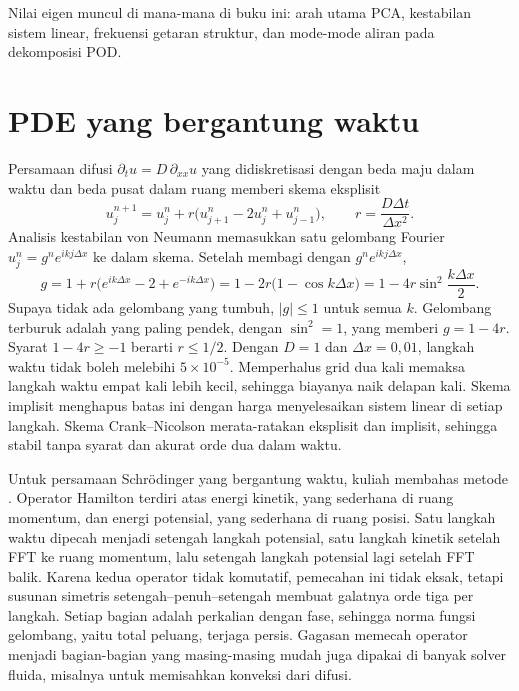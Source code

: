Nilai eigen muncul di mana-mana di buku ini: arah utama PCA, kestabilan sistem linear, frekuensi getaran struktur,
dan mode-mode aliran pada dekomposisi POD.

\section{PDE yang bergantung waktu}

Persamaan difusi $\partial_tu=D\,\partial_{xx}u$ yang didiskretisasi dengan beda maju dalam waktu dan beda pusat
dalam ruang memberi skema eksplisit
\begin{equation}
u_j^{n+1}=u_j^n+r\big(u_{j+1}^n-2u_j^n+u_{j-1}^n\big),\qquad r=\frac{D\Delta t}{\Delta x^2}.
\end{equation}
Analisis kestabilan von Neumann memasukkan satu gelombang Fourier $u_j^n=g^ne^{ikj\Delta x}$ ke dalam skema. Setelah
membagi dengan $g^ne^{ikj\Delta x}$,
\begin{equation}
g=1+r\big(e^{ik\Delta x}-2+e^{-ik\Delta x}\big)=1-2r\big(1-\cos k\Delta x\big)=1-4r\sin^2\frac{k\Delta x}2 .
\end{equation}
Supaya tidak ada gelombang yang tumbuh, $|g|\le1$ untuk semua $k$. Gelombang terburuk adalah yang paling pendek, dengan
$\sin^2=1$, yang memberi $g=1-4r$. Syarat $1-4r\ge-1$ berarti $r\le1/2$. Dengan $D=1$ dan $\Delta x=0{,}01$, langkah waktu
tidak boleh melebihi $5\times10^{-5}$. Memperhalus grid dua kali memaksa langkah waktu empat kali lebih kecil, sehingga
biayanya naik delapan kali. Skema implisit menghapus batas ini dengan harga menyelesaikan sistem linear di setiap
langkah. Skema Crank--Nicolson merata-ratakan eksplisit dan implisit, sehingga stabil tanpa syarat dan akurat orde dua dalam
waktu.

Untuk persamaan Schrödinger yang bergantung waktu, kuliah membahas metode . Operator Hamilton terdiri
atas energi kinetik, yang sederhana di ruang momentum, dan energi potensial, yang sederhana di ruang posisi. Satu langkah
waktu dipecah menjadi setengah langkah potensial, satu langkah kinetik setelah FFT ke ruang momentum, lalu setengah langkah
potensial lagi setelah FFT balik. Karena kedua operator tidak komutatif, pemecahan ini tidak eksak, tetapi susunan simetris
setengah--penuh--setengah membuat galatnya orde tiga per langkah. Setiap bagian adalah perkalian dengan fase, sehingga norma
fungsi gelombang, yaitu total peluang, terjaga persis. Gagasan memecah operator menjadi bagian-bagian yang masing-masing
mudah juga dipakai di banyak solver fluida, misalnya untuk memisahkan konveksi dari difusi.

